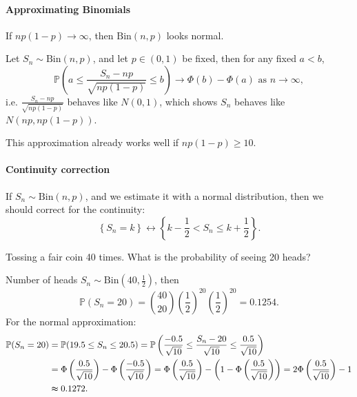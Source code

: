 \paragraph{Approximating Binomials}
If \(np(1 - p) \to \infty\), then \(\mathrm{Bin}(n, p)\) looks normal. 

\begin{theorem}
    Let \(S_n \sim \mathrm{Bin}(n, p)\), and let \(p \in (0, 1)\) be fixed, then for any fixed \(a < b\), 
    \[
        \mathbb{P} \left( a \le \frac{S_n - np}{\sqrt{np(1 - p)} } \le b \right) \to \Phi (b) - \Phi (a) \text{ as } n \to \infty, 
    \]   
    i.e. \(\frac{S_n - np}{\sqrt{np(1 - p)} }\) behaves like \(N(0, 1)\), which shows \(S_n\) behaves like \(N(np, np(1 - p))\).    
\end{theorem}

\begin{remark}
    This approximation already works well if \(np(1 - p) \ge 10\). 
\end{remark}

\paragraph{Continuity correction}

If \(S_n \sim \mathrm{Bin}(n, p) \), and we estimate it with a normal distribution, then we should correct for the continuity: 
\[
    \left\{ S_n = k \right\} \leftrightarrow \left\{ k  - \frac{1}{2} < S_n \le k + \frac{1}{2} \right\}.  
\]

\begin{eg}
    Tossing a fair coin 40 times. What is the probability of seeing 20 heads?
\end{eg}
\begin{answer}
    Number of heads \(S_n \sim \mathrm{Bin}\left( 40, \frac{1}{2} \right)  \), then 
    \[
        \mathbb{P} (S_n = 20) = \binom{40}{20} \left( \frac{1}{2} \right)^{20} \left( \frac{1}{2} \right)^{20} = 0.1254.   
    \] 
    For the normal approximation:
    \begin{align*}
        \mathbb{P} (S_n = 20) &= \mathbb{P} (19.5 \le S_n \le 20.5) = \mathbb{P} \left( \frac{-0.5}{\sqrt{10} } \le \frac{S_n - 20}{\sqrt{10} } \le \frac{0.5}{\sqrt{10} } \right) \\
        &= \Phi \left( \frac{0.5}{\sqrt{10} } \right) - \Phi \left( \frac{-0.5}{\sqrt{10} } \right) = \Phi \left( \frac{0.5}{\sqrt{10} } \right) - \left( 1 - \Phi \left( \frac{0.5}{\sqrt{10} } \right) \right) = 2 \Phi \left( \frac{0.5}{\sqrt{10} } \right) - 1 \\ 
        &\thickapprox 0.1272.   
    \end{align*}
\end{answer}

